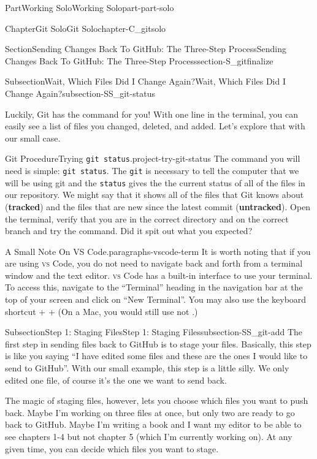\documentclass[twoside,10pt,]{book}
\newcommand{\mono}[1]{\texttt{#1}}
\newcommand{\initialism}[1]{\textsc{\MakeLowercase{#1}}}
\DeclareRobustCommand{\initialismintitle}[1]{\texorpdfstring{#1}{#1}}
\newcommand{\terminology}[1]{\textbf{#1}}
\newcommand{\kbd}[1]{\keys{{#1}}}
\begin{document}
\begin{partptx}{Part}{Working Solo}{}{Working Solo}{}{}{part-part-solo}
\begin{chapterptx}{Chapter}{Git Solo}{}{Git Solo}{}{}{chapter-C_gitsolo}
\begin{sectionptx}{Section}{Sending Changes Back To GitHub: The Three-Step Process}{}{Sending Changes Back To GitHub: The Three-Step Process}{}{}{section-S_gitfinalize}
\begin{subsectionptx}{Subsection}{Wait, Which Files Did I Change Again?}{}{Wait, Which Files Did I Change Again?}{}{}{subsection-SS_git-status}
\par
Luckily, Git has the command for you! With one line in the terminal, you can easily see a list of files you changed, deleted, and added. Let's explore that with our small case.%
\begin{project}{Git Procedure}{Trying \mono{git status}.}{project-try-git-status}%
%
%
The command you will need is simple: \mono{git status}. The \mono{git} is necessary to tell the computer that we will be using git and the \mono{status} gives the the current status of all of the files in our repository. We might say that it shows all of the files that Git knows about (\terminology{tracked}) and the files that are new since the latest commit (\terminology{untracked}). Open the terminal, verify that you are in the correct directory and on the correct branch and try the command. Did it spit out what you expected?%
\end{project}%
\begin{paragraphs}{A Small Note On \initialismintitle{VS} Code.}{paragraphs-vscode-term}%
It is worth noting that if you are using \initialism{VS} Code, you do not need to navigate back and forth from a terminal window and the text editor. \initialism{VS} Code has a built-in interface to use your terminal. To access this, navigate to the ``Terminal'' heading in the navigation bar at the top of your screen and click on ``New Terminal''. You may also use the keyboard shortcut \kbd{Ctrl} + \kbd{Shift} + \kbd{\textasciigrave{}} (On a Mac, you would still use \kbd{Ctrl} not \kbd{command}.)%
\end{paragraphs}%
\end{subsectionptx}
%
%
\typeout{************************************************}
\typeout{************************************************}
%
\begin{subsectionptx}{Subsection}{Step 1: Staging Files}{}{Step 1: Staging Files}{}{}{subsection-SS_git-add}
%
%
%
The first step in sending files back to GitHub is to stage your files. Basically, this step is like you saying ``I have edited some files and these are the ones I would like to send to GitHub''. With our small example, this step is a little silly. We only edited one file, of course it's the one we want to send back.%
\par
The magic of staging files, however, lets you choose which files you want to push back. Maybe I'm working on three files at once, but only two are ready to go back to GitHub. Maybe I'm writing a book and I want my editor to be able to see chapters 1-4 but not chapter 5 (which I'm currently working on). At any given time, you can decide which files you want to stage.%

\end{subsectionptx}
\end{sectionptx}
\end{chapterptx}
\end{partptx}
\end{document}
